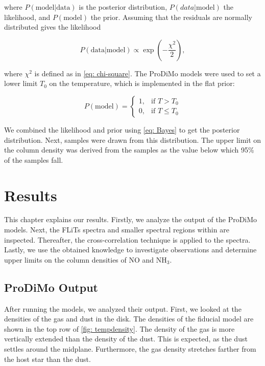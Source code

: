 \documentclass[oneside, single, authoryear, semicolon, 12pt]{lion-msc}
\newcommand{\4}{$_4$}
\newcommand{\3}{$_3$}
\newcommand{\2}{$_2$}
\begin{document}
where $P(\mathrm{model}|\mathrm{data})$ is the posterior distribution, $P(data|\mathrm{model})$ the likelihood, and $P(\mathrm{model})$ the prior. Assuming that the residuals are normally distributed gives the likelihood

\begin{equation}
    P(\mathrm{data}|\mathrm{model})\propto\exp\left(-\frac{\chi^2}{2}\right),
\end{equation}

where $\chi^2$ is defined as in \autoref{eq: chi-square}. The ProDiMo models were used to set a lower limit $T_0$ on the temperature, which is implemented in the flat prior:

\begin{equation}
    P(\mathrm{model}) = 
    \begin{cases}
        1, & \text{if } T > T_0 \\
        0, & \text{if } T \leq T_0
    \end{cases}
\end{equation}

We combined the likelihood and prior using \autoref{eq: Bayes} to get the posterior distribution. Next, samples were drawn from this distribution. The upper limit on the column density was derived from the samples as the value below which 95\% of the samples fall. 


\chapter{Results}\label{Ch: Results}
This chapter explains our results. Firstly, we analyze the output of the ProDiMo models. Next, the FLiTs spectra and smaller spectral regions within are inspected. Thereafter, the cross-correlation technique is applied to the spectra. Lastly, we use the obtained knowledge to investigate observations and determine upper limits on the column densities of NO and NH\3.

\section{ProDiMo Output}\label{sec: Prodimo output}
After running the models, we analyzed their output. First, we looked at the densities of the gas and dust in the disk. The densities of the fiducial model are shown in the top row of \autoref{fig: tempdensity}. The density of the gas is more vertically extended than the density of the dust. This is expected, as the dust settles around the midplane. Furthermore, the gas density stretches farther from the host star than the dust.
\end{document}
